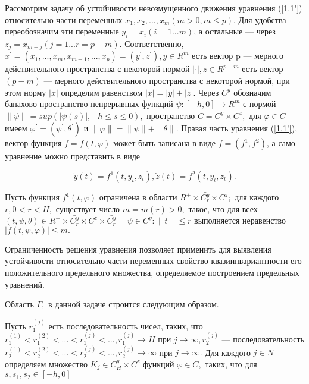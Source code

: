 	Рассмотрим задачу об устойчивости невозмущенного движения уравнения (\ref{1.1'}) относительно части переменных $x_1, x_2, ... , x_m (m > 0, m \le p).$ Для удобства переобозначим эти переменные $y_i = x_i (i = 1...m)$, а остальные --- через $z_j = x_{m+j} (j = 1...r = p - m).$ Соответственно, $x^{'} = (x_1, ... , x_m, x_{m+1}, ..., x_p) = (y^{'}, z^{'}), y \in R^m$ есть вектор p --- мерного действительного пространства с некоторой нормой $|\cdot|, z \in R^{p-m}$ есть вектор $(p-m)$ --- мерного действительного пространства с некоторой нормой, при этом норму $|x|$ определим равенством $|x| = |y| + |z|.$ Через $C^y$ обозначим банахово пространство непрерывных функций $\psi : [-h, 0] \to R^m$ с нормой $\| \psi \| = sup(| \psi(s) |, -h \le s \le 0),$ пространство $C = C^y \times C^z,$ для $\varphi \in C$ имеем $\varphi^{'} = (\psi^{'}, \theta^{'})$ и $\| \varphi \| = \| \psi \| + \| \theta \|.$ Правая часть уравнения (\ref{1.1'}), вектор-функция $f = f(t, \varphi)$ может быть записана в виде $f = (f^1, f^2)$, а само уравнение можно представить в виде 
	
	\begin{equation}
	\dot y(t) = f^1(t, y_t, z_t), \dot z(t) = f^2(t, y_t, z_t).
	\end{equation}
	
	\begin{definition}\label{AS1} Пусть функция $f^1(t, \varphi)$ ограничена в области $R^+ \times \bar{C_r^y} \times C^z; $ для каждого $r, 0 < r < H,$ существует число $m = m(r) > 0,$ такое, что для всех $(t, \psi, \theta) \in R^+ \times \bar{C_r^y} \times C^z \times \bar{C_r^y} = {\psi \in C^y : \| t \| \le r}$ выполняется неравенство $| f(t, \psi, \varphi) |\le m .$
	\end{definition}

Ограниченность решения уравнения позволяет применить для выявления устойчивости относительно части переменных свойство квазиинвариантности его положительного предельного множества, определяемое построением предельных уравнений.
	
	Область $\Gamma, $ в данной задаче строится следующим образом. 
	
	Пусть ${r^{(j)}_1}$ есть последовательность чисел, таких, что $r^{(1)}_1 < r^{(2)}_1 < ... < r^{(j)}_1 < ..., r^{(j)}_1 \to H $ при $j \to \infty, {r^{(j)}_2}$ --- последовательность $r^{(1)}_2 < r^{(2)}_2 < ... < r^{(j)}_2 < ..., r^{(j)}_2 \to \infty $ при $j \to \infty.$ Для каждого $j \in N$ определяем множество $K_j \in C^y_H \times C^z$ функций $\varphi \in C,$ таких, что для $s, s_1, s_2 \in [-h, 0]$
		
